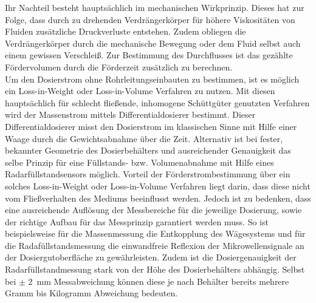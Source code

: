 Ihr Nachteil besteht hauptsächlich im mechanischen Wirkprinzip. Dieses hat zur Folge, dass durch zu drehenden Verdrängerkörper für höhere Viskositäten von Fluiden zusätzliche Druckverluste entstehen. Zudem obliegen die Verdrängerkörper durch die mechanische Bewegung oder dem Fluid selbst auch einem gewissen Verschleiß. Zur Bestimmung des Durchflusses ist das gezählte Fördervolumen durch die Förderzeit zusätzlich zu berechnen.\\
Um den Dosierstrom ohne Rohrleitungseinbauten zu bestimmen, ist es möglich ein Loss-in-Weight oder Loss-in-Volume Verfahren zu nutzen. Mit diesen hauptsächlich für schlecht fließende, inhomogene Schüttgüter genutzten Verfahren wird der Massenstrom mittels Differentialdosierer bestimmt. Dieser Differentialdosierer misst den Dosierstrom im klassischen Sinne mit Hilfe einer Waage durch die Gewichtsabnahme über die Zeit. Alternativ ist bei fester, bekannter Geometrie des Dosierbehälters und ausreichender Genauigkeit das selbe Prinzip für eine Füllstands- bzw. Volumenabnahme mit Hilfe eines Radarfüllstandsensors möglich. Vorteil der Förderstrombestimmung über ein solches Loss-in-Weight oder Loss-in-Volume Verfahren liegt darin, dass diese nicht vom Fließverhalten des Mediums beeinflusst werden. Jedoch ist zu bedenken, dass eine ausreichende Auflösung der Messbereiche für die jeweilige Dosierung, sowie der richtige Aufbau für das Messprinzip garantiert werden muss. So ist beispielsweise für die Massenmessung die Entkopplung des Wägesystems und für die Radafüllstandsmessung die einwandfreie Reflexion der Mikrowellensignale an der Dosiergutoberfläche zu gewährleisten. Zudem ist die Dosiergenauigkeit der Radarfüllstandmessung  stark von der Höhe des Dosierbehälters abhängig. Selbst bei $\pm$ \SI{2}{\milli \meter} Messabweichung können diese je nach Behälter bereits mehrere Gramm bis Kilogramm Abweichung bedeuten.\,\cite{Vetter.2002, VEGA.07.02.2022}


%
%




